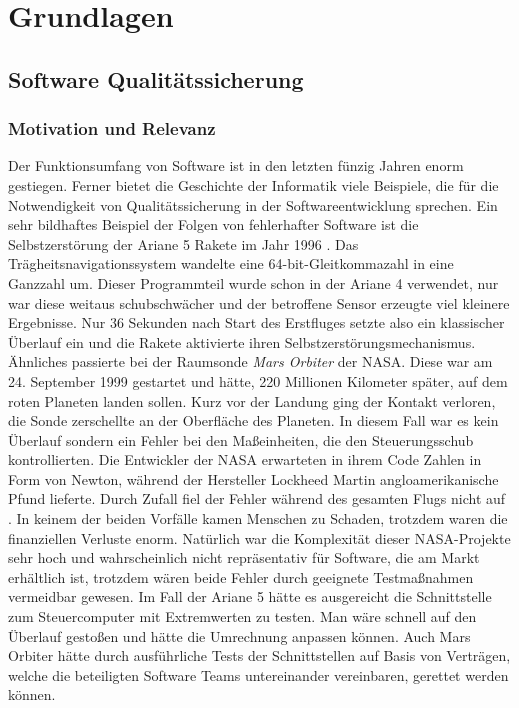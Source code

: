 \chapter{Grundlagen}
\label{sec:fundamentals}

\section{Software Qualitätssicherung}
\label{sec:software_quality}

\subsection{Motivation und Relevanz}
Der Funktionsumfang von Software ist in den letzten fünzig Jahren enorm gestiegen. Ferner bietet die Geschichte der Informatik viele Beispiele, die für die Notwendigkeit von Qualitätssicherung in der Softwareentwicklung sprechen. Ein sehr bildhaftes Beispiel der Folgen von fehlerhafter Software ist die Selbstzerstörung der Ariane 5 Rakete im Jahr 1996 \cite{giese_warum_2002}. Das Trägheitsnavigationssystem wandelte eine 64-bit-Gleitkommazahl in eine Ganzzahl um. Dieser Programmteil wurde schon in der Ariane 4 verwendet, nur war diese weitaus schubschwächer und der betroffene Sensor erzeugte viel kleinere Ergebnisse. Nur 36 Sekunden nach Start des Erstfluges setzte also ein klassischer Überlauf ein und die Rakete aktivierte ihren Selbstzerstörungsmechanismus.
Ähnliches passierte bei der Raumsonde \textit{Mars Orbiter} der NASA. Diese war am 24. September 1999 gestartet und hätte, 220 Millionen Kilometer später, auf dem roten Planeten landen sollen. Kurz vor der Landung ging der Kontakt verloren, die Sonde zerschellte an der Oberfläche des Planeten. In diesem Fall war es kein Überlauf sondern ein Fehler bei den Maßeinheiten, die den Steuerungsschub kontrollierten. Die Entwickler der NASA erwarteten in ihrem Code Zahlen in Form von Newton, während der Hersteller Lockheed Martin angloamerikanische Pfund lieferte. Durch Zufall fiel der Fehler während des gesamten Flugs nicht auf \cite{thaller_software-test:_2002}.
In keinem der beiden Vorfälle kamen Menschen zu Schaden, trotzdem waren die finanziellen Verluste enorm. Natürlich war die Komplexität dieser NASA-Projekte sehr hoch und wahrscheinlich nicht repräsentativ für Software, die am Markt erhältlich ist, trotzdem wären beide Fehler durch geeignete Testmaßnahmen vermeidbar gewesen. Im Fall der Ariane 5 hätte es ausgereicht die Schnittstelle zum Steuercomputer mit Extremwerten zu testen. Man wäre schnell auf den Überlauf gestoßen und hätte die Umrechnung anpassen können. Auch Mars Orbiter hätte durch ausführliche Tests der Schnittstellen auf Basis von Verträgen, welche die beteiligten Software Teams untereinander vereinbaren, gerettet werden können.

